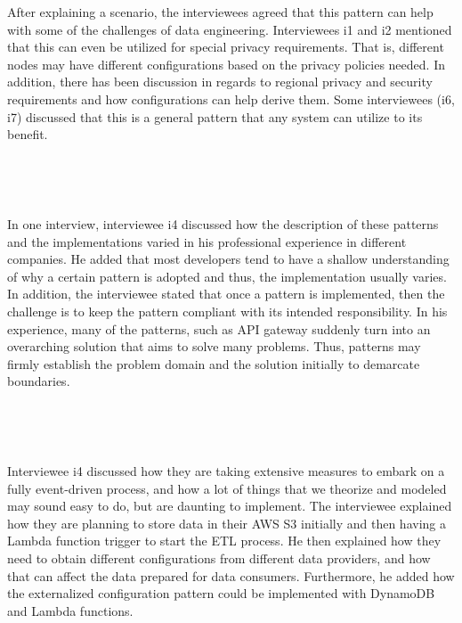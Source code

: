 \documentclass{bmcart}
\begin{document}
After explaining a scenario, the interviewees agreed that this pattern can help with some of the challenges of data engineering. Interviewees i1 and i2 mentioned that this can even be utilized for special privacy requirements. That is, different nodes may have different configurations based on the privacy policies needed. In addition, there has been discussion in regards to regional privacy and security requirements and how configurations can help derive them. Some interviewees (i6, i7) discussed that this is a general pattern that any system can utilize to its benefit. 

\,

\setlength{\fboxsep}{0.7em}
\noindent{}

\,

In one interview, interviewee i4 discussed how the description of these patterns and the implementations varied in his professional experience in different companies. He added that most developers tend to have a shallow understanding of why a certain pattern is adopted and thus, the implementation usually varies. In addition, the interviewee stated that once a pattern is implemented, then the challenge is to keep the pattern compliant with its intended responsibility. In his experience, many of the patterns, such as API gateway suddenly turn into an overarching solution that aims to solve many problems. Thus, patterns may firmly establish the problem domain and the solution initially to demarcate boundaries.

\,

\setlength{\fboxsep}{0.7em}
\noindent{}

\,

Interviewee i4 discussed how they are taking extensive measures to embark on a fully event-driven process, and how a lot of things that we theorize and modeled may sound easy to do, but are daunting to implement. The interviewee explained how they are planning to store data in their AWS S3 initially and then having a Lambda function trigger to start the ETL process. He then explained how they need to obtain different configurations from different data providers, and how that can affect the data prepared for data consumers. Furthermore, he added how the externalized configuration pattern could be implemented with DynamoDB and Lambda functions.
\end{document}

